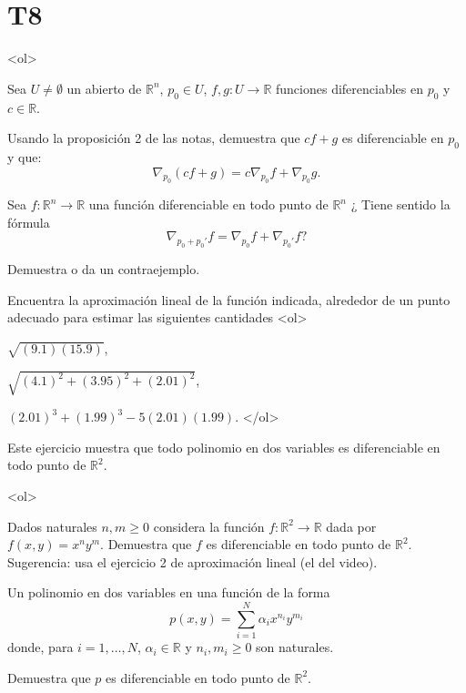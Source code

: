 \documentclass{article}
\theoremstyle{definition}
\begin{document}
\section*{T8 }

<ol>
\item  Sea $U\ne \emptyset$ un abierto de $\mathbb{R}^n$, $p_0\in U$, $f,g :U \to \mathbb{R}$
  funciones diferenciables en $p_0$ y  $c\in \mathbb{R}$.

  Usando la proposición 2 de las notas,  demuestra que $cf+g$ es diferenciable
  en $p_0$ y que:
  $$
  \nabla_{p_0}(cf+g)=c\nabla_{p_0} f+ \nabla_{p_0}g.
  $$

\item Sea $f:\mathbb{R}^n\to \mathbb{R}$
  una función diferenciable en todo punto de $\mathbb{R}^n$ ¿  Tiene sentido la fórmula
  $$
  \nabla_{p_0+p_0'}f=\nabla_{p_0}f+\nabla_{p_0'}f ?
  $$

  Demuestra o da un contraejemplo.

\item Encuentra la aproximación lineal de la función indicada, alrededor de un punto adecuado
  para estimar  las siguientes cantidades
  <ol>
  \item $\sqrt{(9.1)(15.9)}$,
  \item $\sqrt{(4.1)^2+(3.95)^2+(2.01)^2}$,
  \item $(2.01)^3+(1.99)^3-5(2.01)(1.99)$.
  </ol>

  
          \item\label{Ejer:DifPolinomios}
            Este ejercicio muestra que todo polinomio en dos variables es diferenciable en todo
            punto de $\mathbb{R}^2$.

            <ol>
            \item Dados naturales $n,m\geq 0$ considera la función $f:\mathbb{R}^2\to \mathbb{R}$
              dada por $f(x,y)=x^ny^m$. Demuestra que $f$ es diferenciable en todo punto de $\mathbb{R}^2$.  Sugerencia: usa el ejercicio 2 de aproximación
              lineal (el del video). 

             

            \item Un polinomio en dos variables en una función de la forma
              $$
              p(x,y)= \sum_{i=1}^N \alpha_i x^{n_i}y^{m_i}
              $$
              donde, para $i=1,\dots, N$,  $\alpha_i\in \mathbb{R}$ y $n_i,m_i\geq 0$ son naturales.

              Demuestra que $p$ es diferenciable en todo punto de $\mathbb{R}^2$.
\end{document}
